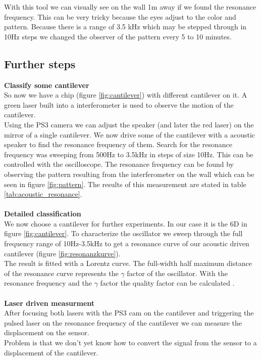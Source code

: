 \documentclass[12pt,a4paper]{article}
\begin{document}
With this tool we can visually see on the wall 1m away if we found the resonance frequency. This can be very tricky because the eyes adjust to the color and pattern. Because there is a range of 3.5 kHz which may be stepped through in 10Hz steps we changed the observer of the pattern every 5 to 10 minutes. 



\subsection{Further steps}
\textbf{Classify some cantilever}\\
So now we have a chip (figure \ref{fig:cantilever}) with different cantilever on it.
A green laser built into a interferometer is used to observe the motion of the cantilever. \\
Using the PS3 camera we can adjust the speaker (and later the red laser) on the mirror of a single cantilever.
We now drive some of the cantilever with a acoustic speaker to find the resonance frequency of them.
Search for the resonance frequency was sweeping from 500Hz to 3.5kHz in steps of size 10Hz. This can be controlled with the oscilloscope.
The resonance frequency can be found by observing the pattern resulting from the interferometer on the wall which can be seen in figure \ref{fig:pattern}.
The results of this measurement are stated in table \ref{tab:acoustic_resonance}.\\
\\
\textbf{Detailed classification}\\
We now choose a cantilever for further experiments. In our case it is the 6D in figure \ref{fig:cantilever}.
To characterize the oscillator we sweep through the full frequency range of 10Hz-3.5kHz to get a resonance curve of our acoustic driven cantilever (figure \ref{fig:resonanzkurve}).\\
The result is fitted with a Lorentz curve. The full-width half maximum distance of the resonance curve represents the $\gamma$ factor of the oscillator. With the resonance frequency and the $\gamma$ factor the quality factor can be calculated .\\
\\
\textbf{Laser driven measurment}\\
After focusing both lasers with the PS3 cam on the cantilever and triggering the pulsed laser on the resonance frequency of the cantilever we can measure the displacement on the sensor. \\
Problem is that we don't yet know how to convert the signal from the sensor to a displacement of the cantilever.
\end{document}
